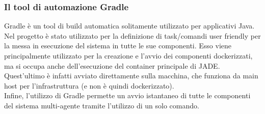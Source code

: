 \subsubsection{Il tool di automazione Gradle}
Gradle è un tool di build automatica solitamente utilizzato per applicativi Java.\\
Nel progetto è stato utilizzato per la definizione di task/comandi user friendly per la messa in esecuzione del sistema in tutte le sue componenti. Esso viene principalmente utilizzato per la creazione e l'avvio dei componenti dockerizzati, ma si occupa anche dell'esecuzione del container principale di JADE. Quest'ultimo è infatti avviato direttamente sulla macchina, che funziona da main host per l'infrastruttura (e non è quindi dockerizzato).\\
Infine, l'utilizzo di Gradle permette un avvio istantaneo di tutte le componenti del sistema multi-agente tramite l'utilizzo di un solo comando.
